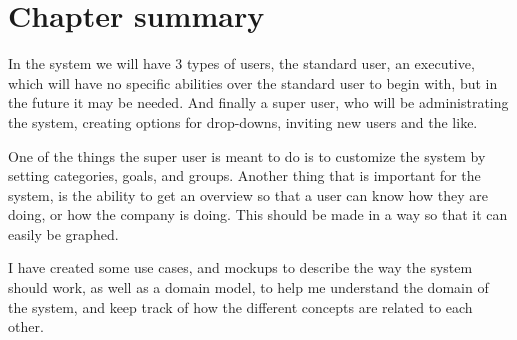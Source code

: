 \section{Chapter summary}
In the system we will have 3 types of users, the standard user, an executive,
which will have no specific abilities over the standard user to begin with, but
in the future it may be needed. And finally a super user, who will be
administrating the system, creating options for drop-downs, inviting new users
and the like.

One of the things the super user is meant to do is to customize the system by
setting categories, goals, and groups. Another thing that is important for the system,
is the ability to get an overview so that a user can know how they are doing, or
how the company is doing. This should be made in a way so that it can easily be
graphed.

I have created some use cases, and mockups to describe the way the system should
work, as well as a domain model, to help me understand the domain of the system,
and keep track of how the different concepts are related to each other.
